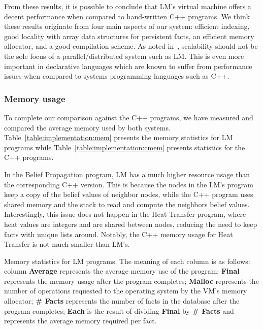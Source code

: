 From these results, it is possible to conclude that LM's virtual machine offers
a decent performance when compared to hand-written C++ programs. We think these
results originate from four main aspects of our system: efficient indexing, good
locality with array data structures for persistent facts, an efficient memory
allocator, and a good compilation scheme. As noted in~\cite{cost}, scalability
should not be the sole focus of a parallel/distributed system such as LM. This
is even more important in declarative languages which are known to suffer from
performance issues when compared to systems programming languages such as C++.

\subsubsection{Memory usage}

To complete our comparison against the C++ programs, we have measured and
compared the average memory used by both systems.
Table~\ref{table:implementation:mem} presents the memory statistics for LM
programs while Table~\ref{table:implementation:cmem} presents statistics for the
C++ programs.

In the Belief Propagation program, LM has a much higher resource usage than the
corresponding C++ version. This is because the nodes in the LM's program keep a
copy of the belief values of neighbor nodes, while the C++ program uses shared
memory and the stack to read and compute the neighbors belief values.
Interestingly, this issue does not happen in the Heat Transfer program, where
heat values are integers and are shared between nodes, reducing the need to keep
facts with unique lists around. Notably, the C++ memory usage for Heat Transfer
is not much smaller than LM's.

\begin{table}[ht]
   \begin{center}
      
   \end{center}
   \caption{Memory statistics for LM programs. The meaning of each column is as
      follows: column \textbf{Average} represents the average memory use of the
      program; \textbf{Final} represents the memory usage after the program
      completes; \textbf{Malloc} represents the number of 
   operations requested to the operating system by the VM's memory allocator;
   \textbf{\# Facts} represents the number of facts in the database after the
   program completes; \textbf{Each} is the result of dividing \textbf{Final} by
   \textbf{\# Facts} and represents the average memory required per fact.}
   \label{table:implementation:mem}
\end{table}

